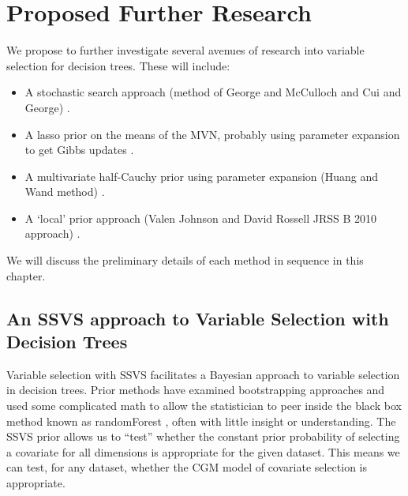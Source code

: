 
\section{Proposed Further Research}
\label{ch:proposed_futue_work}

We propose to further investigate several avenues of research into variable selection for decision trees. These will include: 

\begin{itemize}
\item A stochastic search approach (method of George and McCulloch and Cui and George) \cite{cui2008empirical,george1993variable}. 
\item A lasso prior on the means of the MVN,  probably using parameter expansion to get Gibbs updates \cite{park2008bayesian}. 
\item A multivariate half-Cauchy prior using parameter expansion (Huang and Wand method) \cite{huang2013simple,polson2011half,carvalho2010horseshoe,carvalhohandling}. 
\item A `local' prior approach (Valen Johnson and David Rossell JRSS B 2010 approach) \cite{johnson2010use}. 
\end{itemize}

We will discuss the preliminary details of each method in sequence in this chapter. 

\subsection{An SSVS approach to Variable Selection with Decision Trees}

Variable selection with SSVS facilitates a Bayesian approach to variable selection in decision trees. Prior methods have examined bootstrapping approaches and used some complicated math to allow the statistician to peer inside the black box method known as randomForest \cite{ishwaran2010high, ishwaran2007variable}, often with little insight or understanding. The SSVS prior allows us to ``test'' whether the constant prior probability of selecting a covariate for all dimensions is appropriate for the given dataset. This means we can test, for any dataset, whether the CGM model of covariate selection is appropriate.

